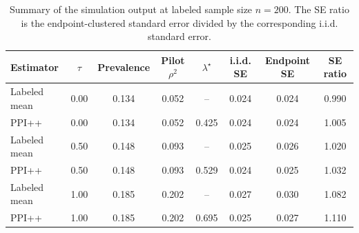 \begin{table}[ht]
\centering
\small
\begin{tabularx}{\textwidth}{@{}lccccccc@{}}
\toprule
Estimator & $\tau$ & Prevalence & Pilot $\rho^2$ & $\lambda^{\star}$ & i.i.d. SE & Endpoint SE & SE ratio \\
\midrule
Labeled mean & 0.00 & 0.134 & 0.052 & -- & 0.024 & 0.024 & 0.990 \\
PPI++ & 0.00 & 0.134 & 0.052 & 0.425 & 0.024 & 0.024 & 1.005 \\
Labeled mean & 0.50 & 0.148 & 0.093 & -- & 0.025 & 0.026 & 1.020 \\
PPI++ & 0.50 & 0.148 & 0.093 & 0.529 & 0.024 & 0.025 & 1.032 \\
Labeled mean & 1.00 & 0.185 & 0.202 & -- & 0.027 & 0.030 & 1.082 \\
PPI++ & 1.00 & 0.185 & 0.202 & 0.695 & 0.025 & 0.027 & 1.110 \\
\bottomrule
\end{tabularx}
\caption[Summary of simulated endpoint-clustered results at n=200]{Summary of the simulation output at labeled sample size $n=200$. The SE ratio is the endpoint-clustered standard error divided by the corresponding i.i.d. standard error.}
\label{tab:sim_endpoint_cluster_summary}
\end{table}
